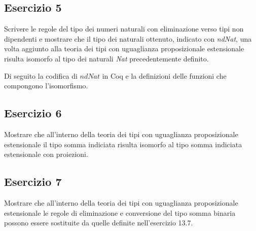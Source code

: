 \subsection{Esercizio 5}
\begin{thm}
	Scrivere le regole del tipo dei numeri naturali con eliminazione verso tipi non dipendenti e mostrare che il tipo dei naturali ottenuto, indicato con \textit{ndNat}, una volta aggiunto alla teoria dei tipi con uguaglianza proposizionale estensionale risulta isomorfo al tipo dei naturali \textit{Nat} precedentemente definito.
\end{thm}

Di seguito la codifica di $ndNat$ in Coq e la definizioni delle funzioni che compongono l'isomorfismo.


\subsection{Esercizio 6}
\begin{thm}
	Mostrare che all’interno della teoria dei tipi con uguaglianza proposizionale estensionale il tipo somma indiciata risulta isomorfo al tipo somma indiciata estensionale con proiezioni.
\end{thm}


\subsection{Esercizio 7}
\begin{thm}
	Mostrare che all’interno della teoria dei tipi con uguaglianza proposizionale estensionale le regole di eliminazione e conversione del tipo somma binaria possono essere sostituite da quelle definite nell'esercizio 13.7.
\end{thm}
